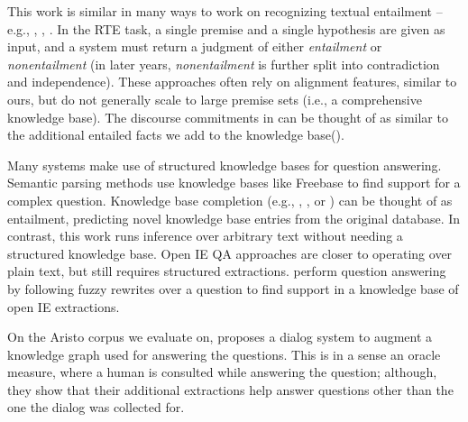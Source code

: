 This work is similar in many ways to work on 
  recognizing textual entailment -- e.g., 
  , ,
  .
In the RTE task, a single premise and a single hypothesis are given as input,
  and a system must return a judgment of either \textit{entailment} or
  \textit{nonentailment} (in later years, \textit{nonentailment} is further
  split into contradiction and independence).
These approaches often rely on alignment features, similar to ours, but
  do not generally scale to large premise sets (i.e., a comprehensive
  knowledge base).
The discourse commitments in  can be thought
  of as similar to the additional entailed facts we add to the
  knowledge base().

Many systems make use of structured knowledge bases for question
  answering.
Semantic parsing methods 
  \cite{key:2005zettlemoyer-semantics,key:2011liang-semantics}
  use knowledge bases like Freebase to find support for a
  complex question.
Knowledge base completion 
  (e.g., , ,
  or ) can be thought of as entailment,
  predicting novel knowledge base entries from the original database.
In contrast, this work runs inference over arbitrary text without
  needing a structured knowledge base.
Open IE \cite{key:2010wu-openie,key:2012mausam-ollie}
  QA approaches are closer to operating over plain text, but
  still requires structured extractions.
 perform question answering by following
  fuzzy rewrites over a question to find support in a knowledge base
  of open IE extractions.

On the Aristo corpus we evaluate on,  proposes
  a dialog system to augment a knowledge graph used for answering the questions.
This is in a sense an oracle measure, where a human is consulted while answering
  the question; although, they show that their additional extractions help
  answer questions other than the one the dialog was collected for.



